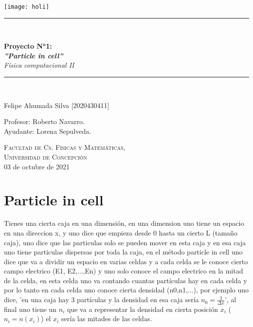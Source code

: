 \documentclass[11pt]{article}
\newcommand{\HRule}{\rule{\linewidth}{0.5mm}}
\begin{document}
\begin{titlepage}
\begin{center}

\texttt{[image: holi]}~\\[1cm]

\HRule \\[0.4cm]
 \LARGE 
  
  \textbf{Proyecto N°1:}\\[0.4cm]
   \textbf{\textit{''Particle in cell''}}\\[0.4cm]
    \emph{Física computacional II\\[0.4cm]}
\HRule \\[1.0cm]

{ \large

    Felipe Ahumada Silva [2020430411]\\[0.1cm]
}

{ \large
    Profesor: Roberto Navarro. \\
    Ayudante: Lorena Sepulveda.
}

\vfill
\textsc{\large Facultad de Cs. Físicas y Matemáticas,\\Universidad de Concepción} \\[0.4cm]
{\large 03 de octubre de 2021}
\end{center}
\end{titlepage}
\newpage

\section{Particle in cell}

Tienes una cierta caja en una dimensión, en una dimension uno tiene un espacio en una direccion x, y uno dice que empieza desde 0 hasta un cierto L (tamaño caja), uno dice que las particulas solo se pueden mover en esta caja y en esa caja uno tiene particulas dispersas por toda la caja, en el método particle in cell uno dice que va a dividir un espacio en varias celdas y a cada celda se le conoce cierto campo electrico (E1, E2,...,En) y uno solo conoce el campo electrico en la mitad de la celda, en esta celda uno va contando cuantas partículas hay en cada celda y por lo tanto en cada celda uno conoce cierta densidad (n0,n1,...), por ejemplo uno dice, 'en una caja hay 3 partículas y la densidad en esa caja sería $n_0 = \frac{3}{\Delta x}$', al final uno tiene un $n_i$ que va a representar la densidad en cierta posición $x_i$ ($n_i = n(x_i)$) el $x_i$ sería las mitades de las celdas.
\end{document}
